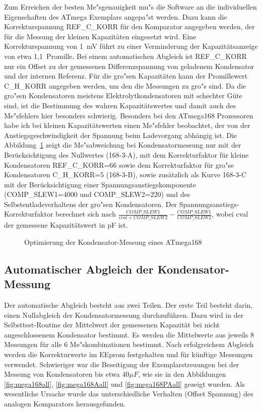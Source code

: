 Zum Erreichen der besten Me"sgenauigkeit mu"s die Software an die individuellen Eigenschaften des ATmega Exemplars
angepa"st werden. Dazu kann die Korrekturspannung REF\_C\_KORR f\"ur den Komparator angegeben werden, der f\"ur die Messung der kleinen 
Kapazit\"aten eingesetzt wird. Eine Korrekturspannung von 1~mV f\"uhrt zu einer Verminderung der Kapazit\"atsanzeige von etwa 1,1~Promille.
Bei einem automatischen Abgleich ist REF\_C\_KORR  nur ein Offset zu der gemessenen Differenzspannung von geladenem Kondensator
und der internen Referenz.
F\"ur die gro"sen Kapazit\"aten kann der Promillewert C\_H\_KORR angegeben werden, um den die Messungen
zu gro"s sind.
Da die gro"sen Kondensatoren meistens Elektrolytkondensatoren mit schechter G\"ute sind, ist die Bestimmung
des wahren Kapazit\"atswertes und damit auch des Me"sfehlers hier besonders schwierig.
Besonders bei den ATmega168 Prozessoren habe ich bei kleinen Kapazit\"atswerten einen Me"sfehler beobachtet, 
der von der Anstiegsgeschwindigkeit der Spannung beim Ladevorgang abh\"angig ist.
Die Abbildung~\ref{fig:mega168optcap} zeigt die Me"sabweichung bei Kondensatormessung nur mit der Ber\"ucksichtigung des
Nullwertes (168-3-A), mit dem Korrekturfaktor f\"ur kleine Kondensatoren REF\_C\_KORR=66 sowie dem Korrekturfaktor f\"ur gro"se
Kondensatoren C\_H\_KORR=5 (168-3-B), sowie zus\"atzlich als Kurve 168-3-C  mit der Ber\"ucksichtigung einer Spannungsanstiegskomponente 
(COMP\_SLEW1=4000 und COMP\_SLEW2=220) und des Selbstentladeverhaltens der gro"sen Kondensatoren.
Der Spannungsanstiegs-Korrekturfaktor berechnet sich nach \(\frac{COMP\_SLEW1}{cval+COMP\_SLEW2} - \frac{COMP\_SLEW1}{COMP\_SLEW2}\),
wobei cval der gemessene Kapazit\"atswert in pF ist.

\begin{figure}[H]
\centering

\caption{Optimierung der Kondensator-Messung eines ATmega168}
\label{fig:mega168optcap}
\end{figure}

\subsection{Automatischer Abgleich der Kondensator-Messung}

Der automatische Abgleich besteht aus zwei Teilen. Der erste Teil besteht darin, einen Nullabgleich der Kondensatormessung durchzuf\"uhren.
Dazu wird in der Selbsttest-Routine der Mittelwert der gemessenen Kapazit\"at bei nicht angeschlossenem Kondensator bestimmt.
Es werden die Mittelwerte aus jeweils 8 Messungen f\"ur alle 6 Me"skombinationen bestimmt.
Nach erfolgreichem Abgleich werden die Korrekturwerte im EEprom festgehalten und f\"ur k\"unftige Messungen verwendet.
Schwieriger war die Beseitigung der Exemplarstreuungen bei der Messung von Kondensatoren bis etwa \(40 \mu F\), wie sie in den 
Abbildungen \ref{fig:mega168all}, \ref{fig:mega168Aall} und \ref{fig:mega168PAall} gezeigt wurden.
Als wesentliche Ursache wurde das unterschiedliche Verhalten (Offset Spannung) des analogen Komparators herausgefunden.

